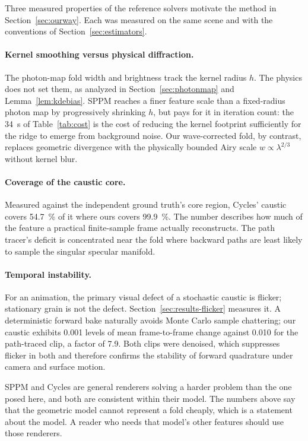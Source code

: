 Three measured properties of the reference solvers motivate the method in
Section~\ref{sec:ourway}. Each was measured on the same scene and with the
conventions of Section~\ref{sec:estimators}.

\paragraph{Kernel smoothing versus physical diffraction.} The photon-map fold width and brightness track the kernel radius $h$. The physics does not set them, as analyzed in Section~\ref{sec:photonmap} and Lemma~\ref{lem:kdebias}. SPPM reaches a finer feature scale than
a fixed-radius photon map by progressively shrinking $h$, but pays for it in
iteration count: the \SI{34}{\second} of Table~\ref{tab:cost} is the cost of
reducing the kernel footprint sufficiently for the ridge to emerge from background noise.
Our wave-corrected fold, by contrast, replaces geometric divergence with the
physically bounded Airy scale $w \propto \lambda^{2/3}$ without kernel blur.

\paragraph{Coverage of the caustic core.} Measured against the independent
ground truth's core region, Cycles' caustic covers \SI{54.7}{\percent} of it
where ours covers \SI{99.9}{\percent}. The number describes how much of the
feature a practical finite-sample frame actually reconstructs. The path
tracer's deficit is concentrated near the fold where backward paths are least
likely to sample the singular specular manifold.

\paragraph{Temporal instability.} For an animation, the primary visual defect of a stochastic caustic is flicker; stationary grain is not the defect. Section~\ref{sec:results-flicker} measures it. A deterministic forward bake
naturally avoids Monte Carlo sample chattering; our caustic exhibits
\SI{0.001}{} levels of mean frame-to-frame change against \SI{0.010}{} for the
path-traced clip, a factor of \num{7.9}. Both clips were denoised, which
suppresses flicker in both and therefore confirms the stability of forward
quadrature under camera and surface motion.

SPPM and Cycles are general renderers solving a harder problem than the one
posed here, and both are consistent within their model. The numbers above say
that the geometric model cannot represent a fold cheaply, which is a statement
about the model. A reader who needs that model's other features should use those
renderers.

